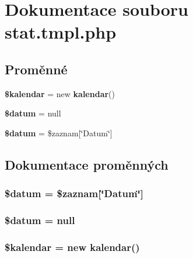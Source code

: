 \section{Dokumentace souboru stat.tmpl.php}
\label{stat_8tmpl_8php}
\subsection*{Proměnné}
\begin{CompactItemize}
\item 
{\bf \$kalendar} = new {\bf kalendar}()
\item 
{\bf \$datum} = null
\item 
{\bf \$datum} = \$zaznam[\char`\"{}Datum\char`\"{}]
\end{CompactItemize}


\subsection{Dokumentace proměnných}
\subsubsection{\setlength{\rightskip}{0pt plus 5cm}\$datum = \$zaznam[\char`\"{}Datum\char`\"{}]}\label{stat_8tmpl_8php_8577bf92daffc681075a34f87f9b8aca}


\subsubsection{\setlength{\rightskip}{0pt plus 5cm}\$datum = null}\label{stat_8tmpl_8php_8577bf92daffc681075a34f87f9b8aca}


\subsubsection{\setlength{\rightskip}{0pt plus 5cm}\${\bf kalendar} = new {\bf kalendar}()}\label{stat_8tmpl_8php_bb965ed7b6ce6910510223f780b3f0f3}


